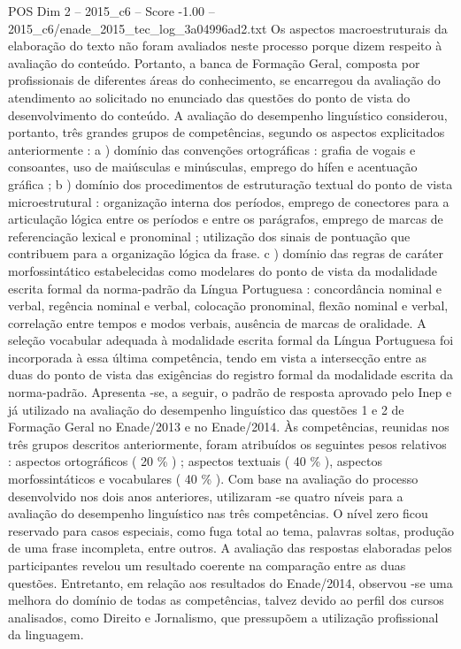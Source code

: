 \begin{textsample}{POS Dim 2 – 2015\_c6 – Score -1.00 – 2015\_c6/enade\_2015\_tec\_log\_3a04996ad2.txt}
Os aspectos macroestruturais da elaboração do texto não foram avaliados neste processo porque dizem respeito à avaliação do conteúdo.
Portanto, a banca de Formação Geral, composta por profissionais de diferentes áreas do conhecimento, se encarregou da avaliação do atendimento ao solicitado no enunciado das questões do ponto de vista do desenvolvimento do conteúdo.
A avaliação do desempenho linguístico considerou, portanto, três grandes grupos de competências, segundo os aspectos explicitados anteriormente : a ) domínio das convenções ortográficas : grafia de vogais e consoantes, uso de maiúsculas e minúsculas, emprego do hífen e acentuação gráfica ; b ) domínio dos procedimentos de estruturação textual do ponto de vista microestrutural : organização interna dos períodos, emprego de conectores para a articulação lógica entre os períodos e entre os parágrafos, emprego de marcas de referenciação lexical e pronominal ; utilização dos sinais de pontuação que contribuem para a organização lógica da frase. c ) domínio das regras de caráter morfossintático estabelecidas como modelares do ponto de vista da modalidade escrita formal da norma-padrão da Língua Portuguesa : concordância nominal e verbal, regência nominal e verbal, colocação pronominal, flexão nominal e verbal, correlação entre tempos e modos verbais, ausência de marcas de oralidade.
A seleção vocabular adequada à modalidade escrita formal da Língua Portuguesa foi incorporada à essa última competência, tendo em vista a intersecção entre as duas do ponto de vista das exigências do registro formal da modalidade escrita da norma-padrão.
Apresenta -se, a seguir, o padrão de resposta aprovado pelo Inep e já utilizado na avaliação do desempenho linguístico das questões 1 e 2 de Formação Geral no Enade/2013 e no Enade/2014.
Às competências, reunidas nos três grupos descritos anteriormente, foram atribuídos os seguintes pesos relativos : aspectos ortográficos ( 20 \% ) ; aspectos textuais ( 40 \% ), aspectos morfossintáticos e vocabulares ( 40 \% ).
Com base na avaliação do processo desenvolvido nos dois anos anteriores, utilizaram -se quatro níveis para a avaliação do desempenho linguístico nas três competências.
O nível zero ficou reservado para casos especiais, como fuga total ao tema, palavras soltas, produção de uma frase incompleta, entre outros.
A avaliação das respostas elaboradas pelos participantes revelou um resultado coerente na comparação entre as duas questões.
Entretanto, em relação aos resultados do Enade/2014, observou -se uma melhora do domínio de todas as competências, talvez devido ao perfil dos cursos analisados, como Direito e Jornalismo, que pressupõem a utilização profissional da linguagem.

\end{textsample}
